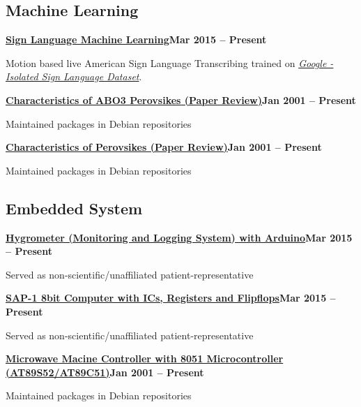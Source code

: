 \documentclass[letterpaper,10pt]{article}
\newcommand{\heading}[2]{
  \hspace{10pt}#1\hfill#2\\
}
\newcommand{\headingBf}[2]{
  \heading{\textbf{#1}}{\textbf{#2}}
}
\newenvironment{resume_list}{
  \vspace{-7pt}
  \begin{itemize}[itemsep=-2px, parsep=1pt, leftmargin=30pt]
}{
  \end{itemize}
}
\begin{document}
  \subsection{Machine Learning}

  \headingBf{\href{https://github.com/omarfarukof/Sign_Language_Prediction}{Sign Language Machine Learning}}{Mar 2015 -- Present}
  \begin{resume_list}
    \item Motion based live American Sign Language Transcribing trained on \href{https://www.kaggle.com/competitions/asl-signs}{\textit{Google - Isolated Sign Language Dataset}}.
  \end{resume_list}

  \headingBf{\href{https://github.com/omarfarukof/ABO3_Perovskites_Classification}{Characteristics of ABO3 Perovsikes (Paper Review)}}{Jan 2001 -- Present}
  \begin{resume_list}
    \item Maintained packages in Debian repositories
  \end{resume_list}

  \headingBf{\href{https://github.com/omarfarukof/perovskites_MC_ML}{Characteristics of Perovsikes (Paper Review)}}{Jan 2001 -- Present}
  \begin{resume_list}
    \item Maintained packages in Debian repositories
  \end{resume_list}

  \subsection{Embedded System}

  \headingBf{\href{https://github.com/omarfarukof/Hygrometer}{Hygrometer (Monitoring and Logging System) with Arduino}}{Mar 2015 -- Present}
  \begin{resume_list}
    \item Served as non-scientific/unaffiliated patient-representative
  \end{resume_list}
 \headingBf{\href{https://github.com/omarfarukof/SAP-1}{SAP-1 8bit Computer with ICs, Registers and Flipflops}}{Mar 2015 -- Present}
  \begin{resume_list}
    \item Served as non-scientific/unaffiliated patient-representative
  \end{resume_list}

  \headingBf{\href{https://github.com/omarfarukof/EEE_4705_Asst}{Microwave Macine Controller with 8051 Microcontroller (AT89S52/AT89C51)}}{Jan 2001 -- Present}
  \begin{resume_list}
    \item Maintained packages in Debian repositories
  \end{resume_list}
\end{document}
